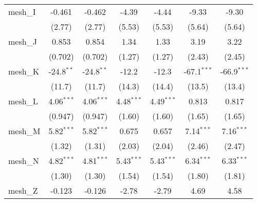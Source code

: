 \begin{tabular}{lcccccc}
   mesh\_I                                                     & -0.461         & -0.462         & -4.39          & -4.44          & -9.33          & -9.30\\   
                                                               & (2.77)         & (2.77)         & (5.53)         & (5.53)         & (5.64)         & (5.64)\\   
   mesh\_J                                                     & 0.853          & 0.854          & 1.34           & 1.33           & 3.19           & 3.22\\   
                                                               & (0.702)        & (0.702)        & (1.27)         & (1.27)         & (2.43)         & (2.45)\\   
   mesh\_K                                                     & -24.8$^{**}$   & -24.8$^{**}$   & -12.2          & -12.3          & -67.1$^{***}$  & -66.9$^{***}$\\   
                                                               & (11.7)         & (11.7)         & (14.3)         & (14.4)         & (13.5)         & (13.4)\\   
   mesh\_L                                                     & 4.06$^{***}$   & 4.06$^{***}$   & 4.48$^{***}$   & 4.49$^{***}$   & 0.813          & 0.817\\   
                                                               & (0.947)        & (0.947)        & (1.60)         & (1.60)         & (1.65)         & (1.65)\\   
   mesh\_M                                                     & 5.82$^{***}$   & 5.82$^{***}$   & 0.675          & 0.657          & 7.14$^{***}$   & 7.16$^{***}$\\   
                                                               & (1.32)         & (1.31)         & (2.03)         & (2.04)         & (2.46)         & (2.47)\\   
   mesh\_N                                                     & 4.82$^{***}$   & 4.81$^{***}$   & 5.43$^{***}$   & 5.43$^{***}$   & 6.34$^{***}$   & 6.33$^{***}$\\   
                                                               & (1.30)         & (1.30)         & (1.54)         & (1.54)         & (1.80)         & (1.81)\\   
   mesh\_Z                                                     & -0.123         & -0.126         & -2.78          & -2.79          & 4.69           & 4.58\\   

\end{tabular}
